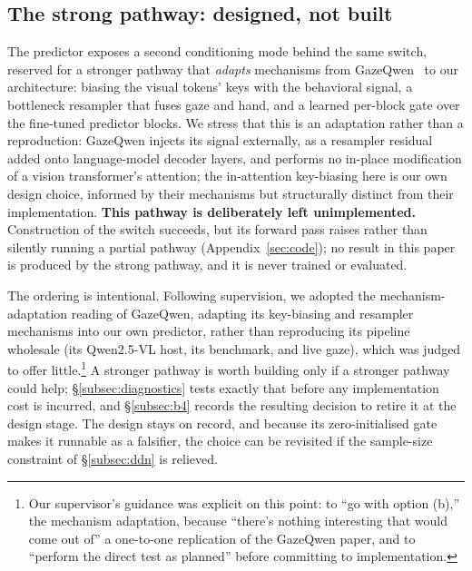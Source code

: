 \subsection{The strong pathway: designed, not built}
\label{subsec:method-strong}

The predictor exposes a second conditioning mode behind the same switch,
reserved for a stronger pathway that \emph{adapts} mechanisms from
GazeQwen~\citep{pham2026gazeqwen} to our architecture: biasing the visual
tokens' keys with the behavioral signal, a bottleneck resampler that fuses gaze
and hand, and a learned per-block gate over the fine-tuned predictor blocks. We
stress that this is an adaptation rather than a reproduction: GazeQwen injects
its signal externally, as a resampler residual added onto language-model decoder
layers, and performs no in-place modification of a vision transformer's
attention; the in-attention key-biasing here is our own design choice, informed
by their mechanisms but structurally distinct from their implementation.
\textbf{This pathway is deliberately left unimplemented.} Construction of the
switch succeeds, but its forward pass raises rather than silently running a
partial pathway (Appendix~\ref{sec:code}); no result in this paper is produced by
the strong pathway, and it is never trained or evaluated.

The ordering is intentional. Following supervision, we adopted the
mechanism-adaptation reading of GazeQwen, adapting its key-biasing and resampler
mechanisms into our own predictor, rather than reproducing its pipeline wholesale
(its Qwen2.5-VL host, its benchmark, and live gaze), which was judged to offer
little.\footnote{Our supervisor's guidance was explicit
on this point: to ``go with option (b),'' the mechanism adaptation, because
``there's nothing interesting that would come out of'' a one-to-one replication
of the GazeQwen paper, and to ``perform the direct test as planned'' before
committing to implementation.} A stronger pathway is worth building only if a
stronger pathway could help; \S\ref{subsec:diagnostics} tests exactly that before
any implementation cost is incurred, and \S\ref{subsec:b4} records the resulting
decision to retire it at the design stage. The design stays on record, and because its zero-initialised gate makes it
runnable as a falsifier, the choice can be revisited if the sample-size
constraint of \S\ref{subsec:ddn} is relieved.

